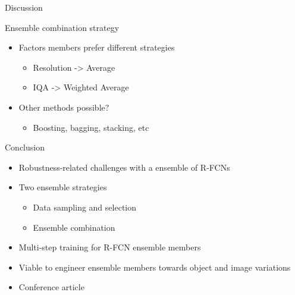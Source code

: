 \begin{frame}{Discussion}{}
    \begin{block}{Ensemble combination strategy}
        \begin{itemize}
            \item Factors members prefer different strategies
            \begin{itemize}
                \item Resolution -> Average
                \item IQA -> Weighted Average
            \end{itemize}
            \item Other methods possible?
            \begin{itemize}
                \item Boosting, bagging, stacking, etc
            \end{itemize} 
        \end{itemize} 
    \end{block} 
\end{frame}

\begin{frame}{Conclusion}{}
    \begin{block}{}
        \begin{itemize}
            \item Robustness-related challenges with a ensemble of R-FCNs
            \item Two ensemble strategies
            \begin{itemize}
                \item Data sampling and selection
                \item Ensemble combination
            \end{itemize}
            \item Multi-step training for R-FCN ensemble members
            \item Viable to engineer ensemble members towards object and image variations
            \item Conference article
        \end{itemize} 
    \end{block} 
\end{frame}